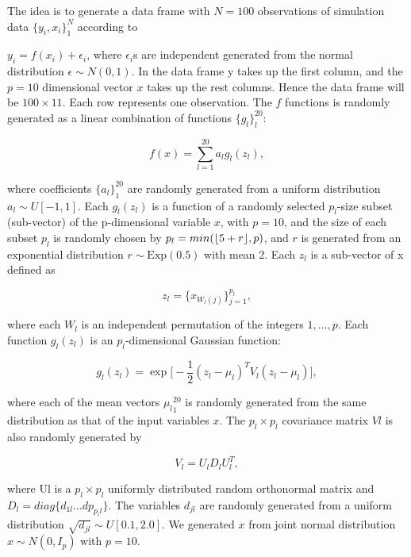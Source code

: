 \documentclass{article}
\DeclarePairedDelimiter\floor{\lfloor}{\rfloor}
\begin{document}
The idea is to generate a data frame with $N = 100$ observations of simulation data $\{y_i,x_i\}^N_1$ according to

$y_i =f(x_i)+\epsilon_i$,
where $\epsilon_i$s are independent generated from the normal distribution
$\epsilon ∼ N(0, 1)$. In the data frame y takes up the first column, and the $p =
10$ dimensional vector $x$ takes up the rest columns. Hence the data frame will be
$100 \times 11$. Each row represents one observation. The $f$ functions is randomly
generated as a linear combination of functions $\{g_l\}_l^{20}$:

\begin{equation}
f(x) = \sum_{l=1}^{20} a_l g_l (z_l),
\end{equation}

where coefficients $\{a_l\}_1^{20}$ are randomly generated from a uniform
distribution $a_l ∼ U[−1, 1]$. Each $g_l(z_l)$ is a function of a randomly selected
$p_l$-size subset (sub-vector) of the p-dimensional variable $x$, with $p = 10$, and
the size of each subset $p_l$ is randomly chosen by $p_l = min(\floor*{5 + r} ,
p)$, and $r$ 
is generated from an exponential distribution $r \sim \text{Exp}(0.5)$ with mean
2. Each $z_l$ is a sub-vector of x defined as 

\begin{equation}
z_l = \{x_{W_l (j)}\}_{j=1}^{p_l},
\end{equation}

where each $W_l$ is an independent permutation of the integers ${1,\ldots, p}$.
Each function $g_l(z_l)$ is an $p_l$-dimensional Gaussian function:

\begin{equation}
  g_l(z_l) = \exp \Bigg[ -\frac{1}{2} (z_l-\mu_l)^T V_l(z_l-\mu_l) \Bigg],
\end{equation}

where each of the mean vectors ${\mu_l}_1^{20}$ is randomly
generated from the same distribution as that of the input variables $x$. The
$p_l × p_l$ covariance matrix $Vl$ is also randomly generated by

\begin{equation}
V_l = U_lD_lU^T_l ,
\end{equation}

where Ul is a $p_l \times p_l$ uniformly distributed random orthonormal
matrix and $D_l = diag \{d_{1l} \dots dp_{p_l l}\}$. The variables $d_{jl}$ are randomly generated from
a uniform distribution $\sqrt{d_{jl}} \sim U[0.1, 2.0]$. We generated $x$ from joint normal
distribution $x \sim N(0, I_p)$ with $p = 10$.
\end{document}

